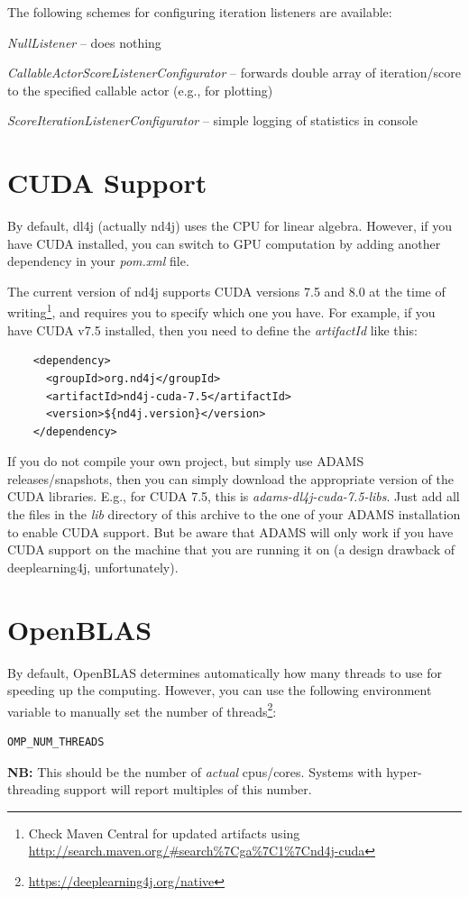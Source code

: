 \documentclass[a4paper]{book}
\begin{document}
The following schemes for configuring iteration listeners are available:
\begin{tight_itemize}
  \item \textit{NullListener} -- does nothing
  \item \textit{CallableActorScoreListenerConfigurator} -- forwards double array
  of iteration/score to the specified callable actor (e.g., for plotting)
  \item \textit{ScoreIterationListenerConfigurator} -- simple logging of
  statistics in console
\end{tight_itemize}


\chapter{CUDA Support}
By default, dl4j (actually nd4j\cite{nd4j}) uses the CPU for linear algebra.
However, if you have CUDA installed, you can switch to GPU computation by
adding another dependency in your \textit{pom.xml} file.

The current version of nd4j supports CUDA\cite{cuda} versions
7.5 and 8.0 at the time of writing\footnote{Check Maven Central for updated
artifacts using \url{http://search.maven.org/\#search\%7Cga\%7C1\%7Cnd4j-cuda}{}},
and requires you to specify which one you have.
For example, if you have CUDA v7.5 installed, then you need to define the
\textit{artifactId} like this:

\begin{verbatim}
    <dependency>
      <groupId>org.nd4j</groupId>
      <artifactId>nd4j-cuda-7.5</artifactId>
      <version>${nd4j.version}</version>
    </dependency>
\end{verbatim}

If you do not compile your own project, but simply use ADAMS releases/snapshots,
then you can simply download the appropriate version of the CUDA libraries. E.g.,
for CUDA 7.5, this is \textit{adams-dl4j-cuda-7.5-libs}. Just add all the
files in the \textit{lib} directory of this archive to the one of your ADAMS
installation to enable CUDA support. But be aware that ADAMS will only work
if you have CUDA support on the machine that you are running it on (a
design drawback of deeplearning4j, unfortunately).


\chapter{OpenBLAS}
By default, OpenBLAS determines automatically how many threads to use for
speeding up the computing. However, you can use the following environment
variable to manually set the number of
threads\footnote{\url{https://deeplearning4j.org/native}{}}:
\begin{verbatim}
OMP_NUM_THREADS
\end{verbatim}
\textbf{NB:} This should be the number of \textit{actual} cpus/cores.
Systems with hyper-threading support will report multiples of this number.
\end{document}
